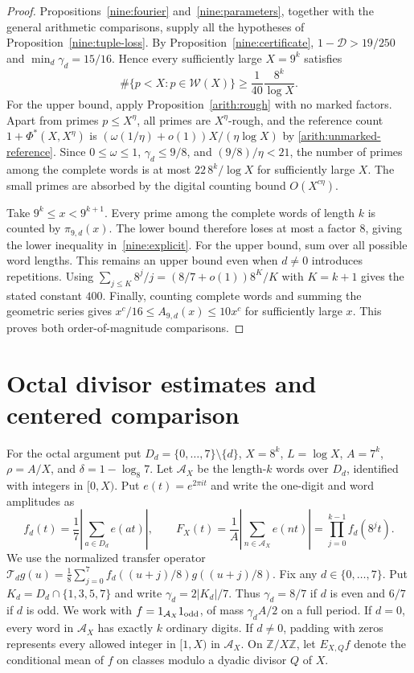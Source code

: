 \documentclass[11pt,a4paper]{article}
\theoremstyle{paperplain}
\numberwithin{equation}{section}
\begin{document}
\begin{proof}
Propositions~\ref{nine:fourier} and~\ref{nine:parameters}, together with the
general arithmetic comparisons, supply all the hypotheses of
Proposition~\ref{nine:tuple-loss}.
By Proposition~\ref{nine:certificate},
$1-\mathcal D>19/250$ and $\min_d\gamma_d=15/16$.
Hence every sufficiently large $X=9^k$ satisfies
\[
 \#\{p<X:p\in\mathcal W(X)\}\ge\frac1{40}\frac{8^k}{\log X}.
\]
For the upper bound, apply Proposition~\ref{arith:rough} with no marked factors.
Apart from primes $p\le X^\eta$, all primes are $X^\eta$-rough, and the
reference count $1+\Phi^*(X,X^\eta)$ is
$(\omega(1/\eta)+o(1))X/(\eta\log X)$ by \eqref{arith:unmarked-reference}.
Since $0\le\omega\le1$, $\gamma_d\le9/8$, and $(9/8)/\eta<21$,
the number of primes among the complete words is at most
$22\,8^k/\log X$ for sufficiently large $X$.
The small primes are absorbed by the digital counting bound $O(X^{c\eta})$.

Take $9^k\le x<9^{k+1}$.
Every prime among the complete words of length $k$ is counted by
$\pi_{9,d}(x)$.
The lower bound therefore loses at most a factor $8$, giving the lower
inequality in~\eqref{nine:explicit}.
For the upper bound, sum over all possible word lengths.
This remains an upper bound even when $d\ne0$ introduces repetitions.
Using
$\sum_{j\le K}8^j/j=(8/7+o(1))8^K/K$
with $K=k+1$ gives the stated constant $400$.
Finally, counting complete words and summing the geometric series gives
$x^c/16\le A_{9,d}(x)\le10x^c$ for sufficiently large $x$.
This proves both order-of-magnitude comparisons.
\end{proof}

\section{Octal divisor estimates and centered comparison}
\label{sec:octal-typeI}

For the octal argument put $D_d=\{0,\ldots,7\}\setminus\{d\}$,
$X=8^k$, $L=\log X$, $A=7^k$, $\rho=A/X$, and
$\delta=1-\log_8 7$. Let $\mathcal A_X$ be the length-$k$ words
over $D_d$, identified with integers in $[0,X)$. Put $e(t)=e^{2\pi i t}$
and write the one-digit and word amplitudes as
\[
 f_d(t)=\frac17\left|\sum_{a\in D_d}e(at)\right|,
 \qquad
 F_X(t)=\frac1A\left|\sum_{n\in\mathcal A_X}e(nt)\right|
       =\prod_{j=0}^{k-1}f_d(8^jt).
\]
We use the normalized transfer operator
$\mathcal T_d g(u)=\tfrac18\sum_{j=0}^7 f_d((u+j)/8)g((u+j)/8)$.
Fix any $d\in\{0,\ldots,7\}$. Put $K_d=D_d\cap\{1,3,5,7\}$ and
write $\gamma_d=2|K_d|/7$. Thus $\gamma_d=8/7$ if $d$ is even and
$6/7$ if $d$ is odd. We work with $f=1_{\mathcal A_X}1_{\rm odd}$,
of mass $\gamma_d A/2$ on a full period. If $d=0$, every word in
$\mathcal A_X$ has exactly $k$ ordinary digits. If $d\ne0$, padding
with zeros represents every allowed integer in $[1,X)$ in $\mathcal A_X$.
On $\mathbb Z/X\mathbb Z$, let $E_{X,Q}f$ denote the conditional mean
of $f$ on classes modulo a dyadic divisor $Q$ of $X$.
\end{document}
